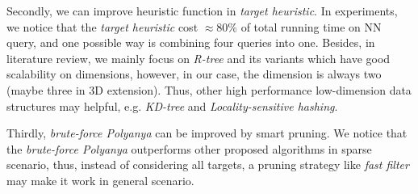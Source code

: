 Secondly, we can improve heuristic function in \textit{target heuristic}.
In experiments, we notice that the \textit{target heuristic} cost $\approx 80\%$ of
total running time on NN query, and one possible way is combining four queries into one.
Besides, in literature review, we mainly focus on \textit{R-tree} and its variants which
have good scalability on dimensions, however, in our case, the dimension is always two (maybe
three in 3D extension). Thus, other high performance low-dimension data structures may helpful,
e.g. \textit{KD-tree}\cite{ooi1987spatial} and
\textit{Locality-sensitive hashing}\cite{slaney2008locality}.

Thirdly, \textit{brute-force Polyanya} can be improved by smart pruning. We notice that
the \textit{brute-force Polyanya} outperforms other proposed algorithms in sparse scenario,
thus, instead of considering all targets,
a pruning strategy like \textit{fast filter}\cite{xia2004fast} may make it work in general
scenario.
